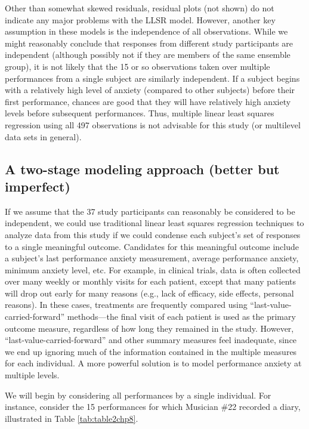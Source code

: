 \documentclass[
]{krantz}
\begin{document}
Other than somewhat skewed residuals, residual plots (not shown) do not indicate any major problems with the LLSR model. However, another key assumption in these models is the independence of all observations. While we might reasonably conclude that responses from different study participants are independent (although possibly not if they are members of the same ensemble group), it is not likely that the 15 or so observations taken over multiple performances from a single subject are similarly independent. If a subject begins with a relatively high level of anxiety (compared to other subjects) before their first performance, chances are good that they will have relatively high anxiety levels before subsequent performances. Thus, multiple linear least squares regression using all 497 observations is not advisable for this study (or multilevel data sets in general).

\hypertarget{twostage}{%
\subsection{A two-stage modeling approach (better but imperfect)}\label{twostage}}

If we assume that the 37 study participants can reasonably be considered to be independent, we could use traditional linear least squares regression techniques to analyze data from this study if we could condense each subject's set of responses to a single meaningful outcome. Candidates for this meaningful outcome include a subject's last performance anxiety measurement, average performance anxiety, minimum anxiety level, etc. For example, in clinical trials, data is often collected over many weekly or monthly visits for each patient, except that many patients will drop out early for many reasons (e.g., lack of efficacy, side effects, personal reasons). In these cases, treatments are frequently compared using ``last-value-carried-forward'' methods---the final visit of each patient is used as the primary outcome measure, regardless of how long they remained in the study. However, ``last-value-carried-forward'' and other summary measures feel inadequate, since we end up ignoring much of the information contained in the multiple measures for each individual. A more powerful solution is to model performance anxiety at multiple levels.

We will begin by considering all performances by a single individual. For instance, consider the 15 performances for which Musician \#22 recorded a diary, illustrated in Table \ref{tab:table2chp8}.
\end{document}

